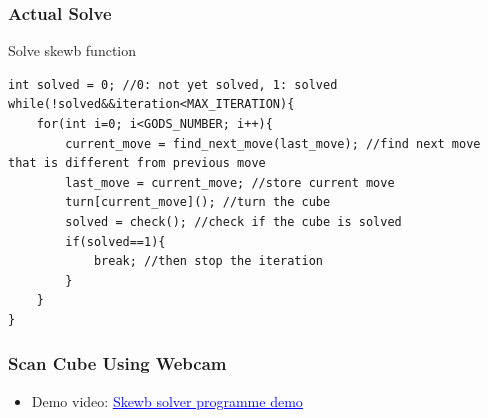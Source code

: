 \documentclass[aspectratio=169]{beamer}
\begin{document}
\begin{frame}[fragile]
\frametitle{Actual Solve}
\begin{block}{Solve skewb function}
\begin{center}\begin{minipage}{0.95\textwidth}
\begin{lstlisting} 
int solved = 0; //0: not yet solved, 1: solved
while(!solved&&iteration<MAX_ITERATION){
    for(int i=0; i<GODS_NUMBER; i++){
        current_move = find_next_move(last_move); //find next move that is different from previous move
        last_move = current_move; //store current move
        turn[current_move](); //turn the cube
        solved = check(); //check if the cube is solved
        if(solved==1){
            break; //then stop the iteration
        }
    }
}
\end{lstlisting}
\end{minipage}\end{center}
\end{block}
\end{frame}





\begin{frame}
\frametitle{Scan Cube Using Webcam}
\begin{itemize}
    \item Demo video: \href{https://youtu.be/f4b-0wV-rUE}{\textcolor{blue}{\underline{Skewb solver programme demo}}}
\end{itemize}
\end{frame}
\end{document}
